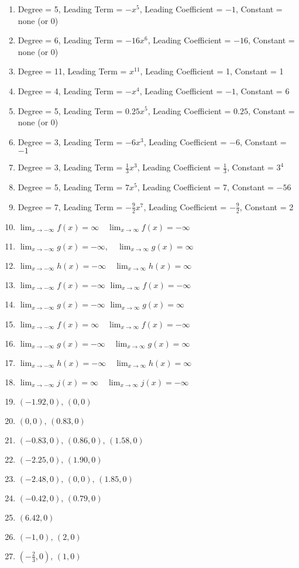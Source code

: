 \begin{enumerate}
	\item Degree = 5, Leading Term = $-x^5$, Leading Coefficient = $-1$, Constant = none (or 0)
	\item Degree = 6, Leading Term = $-16x^6$, Leading Coefficient = $-16$, Constant = none (or 0)
	\item Degree = 11, Leading Term = $x^{11}$, Leading Coefficient = 1, Constant = 1
	\item Degree = 4, Leading Term = $-x^4$, Leading Coefficient = $-1$, Constant = 6
	\item Degree = 5, Leading Term = $0.25x^5$, Leading Coefficient = $0.25$, Constant = none (or 0)
	\item Degree = 3, Leading Term = $-6x^3$, Leading Coefficient = $-6$, Constant = $-1$
	\item Degree = 3, Leading Term = $\frac{1}{3}x^3$, Leading Coefficient = $\frac{1}{3}$, Constant = $3^4$
	\item Degree = 5, Leading Term = $7x^5$, Leading Coefficient = 7, Constant = $-56$
	\item Degree = 7, Leading Term = $-\frac{9}{2}x^7$, Leading Coefficient = $-\frac{9}{2}$, Constant = 2
	\item $\lim_{x \to -\infty} f(x) = \infty \quad \lim_{x \to \infty}f(x) = -\infty$
	\item $\lim_{x \to -\infty} g(x) = -\infty, \quad \lim_{x \to \infty}g(x) = \infty$
	\item $\lim_{x \to -\infty} h(x) = -\infty \quad \lim_{x \to \infty}h(x) =\infty$
	\item $\lim_{x \to -\infty}f(x) = -\infty$ \quad $\lim_{x \to \infty}f(x) = -\infty$
    \item $\lim_{x \to -\infty}g(x) = -\infty$ \quad $\lim_{x \to \infty}g(x) = \infty$
    \item $\lim_{x \to -\infty} f(x) = \infty \quad \lim_{x \to \infty} f(x) = - \infty$
    \item $\lim_{x \to -\infty} g(x) = -\infty \quad \lim_{x \to \infty} g(x) = \infty$
    \item $\lim_{x \to -\infty} h(x) = -\infty \quad \lim_{x \to \infty} h(x) = \infty$
     \item $\lim_{x \to -\infty} j(x) = \infty \quad \lim_{x \to \infty} j(x) = -\infty$
     \item $(-1.92,0), \, (0,0)$
     \item $(0,0), \, (0.83,0)$
     \item $(-0.83,0), \, (0.86,0), \, (1.58,0)$
     \item $(-2.25,0), \, (1.90,0)$
     \item $(-2.48,0), \, (0,0), \, (1.85,0)$
     \item $(-0.42,0), \, (0.79,0)$
     \item $(6.42,0)$
     \item $(-1,0), \, (2,0)$
     \item $\left(-\frac{2}{3},0\right), \, (1,0)$
\end{enumerate}
